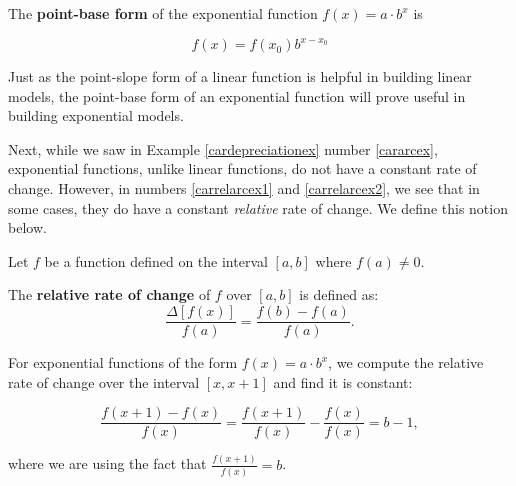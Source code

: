 \smallskip

\colorbox{ResultColor}{\bbm

\begin{defn}\label{expfcnpointbaseform}  The   \textbf{point-base form} of the exponential function $f(x) = a \cdot b^{x}$  is

\[ f(x) = f(x_{0}) b^{x - x_{0}} \]


\end{defn}

\ebm}

\smallskip

Just as the point-slope form of a linear function is helpful in building linear models, the point-base form of an exponential function will prove useful in building exponential models.

\smallskip

Next, while we saw in Example \ref{cardepreciationex} number \ref{cararcex}, exponential functions, unlike linear functions, do not have a constant rate of change.  However, in numbers \ref{carrelarcex1} and \ref{carrelarcex2}, we see that in some cases, they do have a constant \textit{relative} rate of change.  We define this notion below.

\smallskip


\colorbox{ResultColor}{\bbm

\begin{defn} \label{rrc}  Let $f$ be a function defined on the interval $[a,b]$ where $f(a) \neq 0$.

The \textbf{relative rate of  change}  of $f$ over $[a,b]$ is defined as: \[ \dfrac{\Delta [f(x)] }{f(a)} = \dfrac{f(b) - f(a)}{f(a)} .\]

\end{defn}

\ebm}

\smallskip

For exponential functions of the form $f(x) = a \cdot b^{x}$, we compute the relative rate of change over the interval $[x, x+1]$ and find it is constant:

\[ \dfrac{f(x+1) - f(x)}{f(x)} = \dfrac{f(x+1)}{f(x)} - \dfrac{f(x)}{f(x)} = b -1,\]

where we are using the fact that $\frac{f(x+1)}{f(x)} = b$. 

\smallskip

